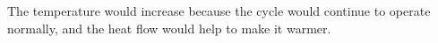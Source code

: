 The temperature would increase because the cycle would continue to operate normally, and the heat flow would help to make it warmer.